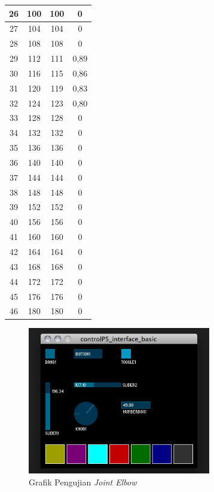 \begin{table}[]
\begin{tabular}{|c|c|c|c|}
 		26 & 100     & 100      & 0           \\ \hline
 		27 & 104     & 104      & 0           \\ \hline
 		28 & 108     & 108      & 0           \\ \hline
 		29 & 112     & 111      & 0,89 \\ \hline
 		30 & 116     & 115      & 0,86 \\ \hline
 		31 & 120     & 119      & 0,83 \\ \hline
 		32 & 124     & 123      & 0,80 \\ \hline
 		33 & 128     & 128      & 0           \\ \hline
 		34 & 132     & 132      & 0           \\ \hline
 		35 & 136     & 136      & 0           \\ \hline
 		36 & 140     & 140      & 0           \\ \hline
 		37 & 144     & 144      & 0           \\ \hline
 		38 & 148     & 148      & 0           \\ \hline
 		39 & 152     & 152      & 0           \\ \hline
 		40 & 156     & 156      & 0           \\ \hline
 		41 & 160     & 160      & 0           \\ \hline
 		42 & 164     & 164      & 0           \\ \hline
 		43 & 168     & 168      & 0           \\ \hline
 		44 & 172     & 172      & 0           \\ \hline
 		45 & 176     & 176      & 0           \\ \hline
 		46 & 180     & 180      & 0           \\ \hline
 	\end{tabular}
 \end{table} 
 \begin{figure}[H]
 	\centering
 	\includegraphics[width=8cm]{gambar/controlp5.jpg}
 	\caption{Grafik Pengujian \textit{Joint Elbow}}
 	\label{pic.jointelbow}
 \end{figure}
 
